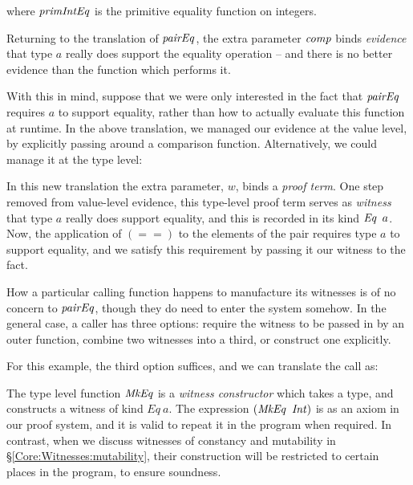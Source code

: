 where $\operatorname{\mathit{primIntEq}}$ is the primitive equality function on integers. 

Returning to the translation of $\operatorname{\mathit{pairEq}}$, the extra parameter $\operatorname{\mathit{comp}}$ binds \emph{evidence} \cite{jones:qualified-types} that type $a$ really does support the equality operation -- and there is no better evidence than the function which performs it. 

With this in mind, suppose that we were only interested in the fact that $\operatorname{\mathit{pairEq}}$ requires $a$ to support equality, rather than how to actually evaluate this function at runtime. In the above translation, we managed our evidence at the value level, by explicitly passing around a comparison function. Alternatively, we could manage it at the type level:


\vspace{-3ex}


\medskip
In this new translation the extra parameter, $w$, binds a \emph{proof term}. One step removed from value-level evidence, this type-level proof term serves as \emph{witness} that type $a$ really does support equality, and this is recorded in its kind $\operatorname{\mathit{Eq}} \ a$. Now, the application of $(==)$ to the elements of the pair requires type $a$ to support equality, and we satisfy this requirement by passing it our witness to the fact. 

How a particular calling function happens to manufacture its witnesses is of no concern to $\operatorname{\mathit{pairEq}}$, though they do need to enter the system somehow. In the general case, a caller has three options: require the witness to be passed in by an outer function, combine two witnesses into a third, or construct one explicitly.

For this example, the third option suffices, and we can translate the call as:


The type level function $\operatorname{\mathit{MkEq}}$ is a \emph{witness constructor} which takes a type, and constructs a witness of kind $Eq \ a$. The expression $(\operatorname{\mathit{MkEq}} \ \operatorname{\mathit{Int}})$ is as an axiom in our proof system, and it is valid to repeat it in the program when required. In contrast, when we discuss witnesses of constancy and mutability in \S\ref{Core:Witnesses:mutability}, their construction will be restricted to certain places in the program, to ensure soundness.

